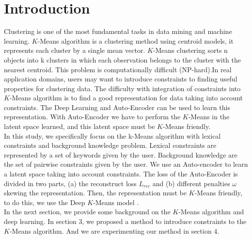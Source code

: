 \section{Introduction}\label{sec:intro}

Clustering is one of the most fundamental tasks in data mining and machine
learning. $K$-Means algorithm is a clustering method using centroid models,
it represents each cluster by a single mean vector. $K$-Means clustering sorts
n objects into k clusters in which each observation belongs to
the cluster with the nearest centroid. This problem is computationally
difficult (NP-hard).In real application domains, users may want to introduce 
constraints to finding 
useful properties for clustering data. The difficulty with integration of 
constraints into $K$-Means algorithm is to find a good representation for data 
taking into account constraints. The Deep Learning and Auto-Encoder can be used 
to learn this representation. With Auto-Encoder we have to perform the $K$-Means
in the latent space learned, and this latent space must be $K$-Means friendly.
\\In this study, we specifically focus on the k-Means algorithm with lexical constraints 
and background knowledge problem. Lexical constraints are represented
by a set of keywords given by the user. Background knowledge are the set of 
pairwise constraints given by the user.  We use an Auto-encoder to learn a latent space taking
into account constraints. The loss of the Auto-Encoder is divided in two parts, (a) 
the reconstruct loss $L_{rec}$ and (b) different penalties $\omega$ skewing the
representation. Then, the representation must be $K$-Means friendly, 
to do this, we use the Deep $K$-Means model \cite{Deap-K-Means}.  
\\In the next section, we provide some background on the $K$-Means algorithm and
deep learning. In section 3, we proposed a method to introduce constraints to 
the $K$-Means algorithm. And we are experimenting our method in section 4.
